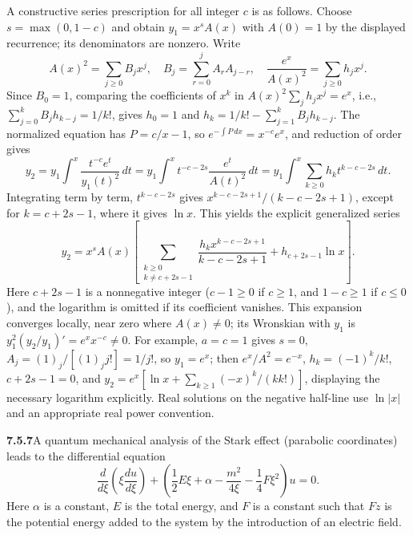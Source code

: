 \par{}
A constructive series prescription for all integer $c$ is as follows. Choose
$s=\max(0,1-c)$ and obtain $y_1=x^sA(x)$ with $A(0)=1$ by the displayed
recurrence; its denominators are nonzero. Write
\[
A(x)^2=\sum_{j\ge0}B_jx^j,\quad B_j=\sum_{r=0}^jA_rA_{j-r},
\quad \frac{e^x}{A(x)^2}=\sum_{j\ge0}h_jx^j.
\]
Since $B_0=1$, comparing the coefficients of $x^k$ in
$A(x)^2\sum_jh_jx^j=e^x$, i.e., $\sum_{j=0}^kB_jh_{k-j}=1/k!$, gives
$h_0=1$ and $h_k=1/k!-\sum_{j=1}^k B_jh_{k-j}$.
The normalized equation has $P=c/x-1$, so $e^{-\int P\,dx}=x^{-c}e^x$,
and reduction of order gives
\[
y_2=y_1\int^x\frac{t^{-c}e^t}{y_1(t)^2}\,dt
=y_1\int^x t^{-c-2s}\frac{e^t}{A(t)^2}\,dt
=y_1\int^x\sum_{k\ge0}h_kt^{k-c-2s}\,dt.
\]
Integrating term by term, $t^{k-c-2s}$ gives
$x^{k-c-2s+1}/(k-c-2s+1)$, except for $k=c+2s-1$, where it gives
$\ln x$. This yields the explicit generalized series
\[
y_2=x^sA(x)\left[
\sum_{\substack{k\ge0\\k\ne c+2s-1}}
 \frac{h_kx^{k-c-2s+1}}{k-c-2s+1}
+h_{c+2s-1}\ln x\right].
\]
Here $c+2s-1$ is a nonnegative integer ($c-1\ge0$ if $c\ge1$, and
$1-c\ge1$ if $c\le0$), and the logarithm is omitted
if its coefficient vanishes. This expansion converges locally, near zero
where $A(x)\ne0$; its Wronskian with $y_1$ is
$y_1^2(y_2/y_1)'=e^xx^{-c}\ne0$.
For example, $a=c=1$ gives $s=0$, $A_j=(1)_j/[(1)_jj!]=1/j!$, so
$y_1=e^x$; then $e^x/A^2=e^{-x}$, $h_k=(-1)^k/k!$, $c+2s-1=0$, and
$y_2=e^x[\ln x+\sum_{k\ge1}(-x)^k/(k k!)]$, displaying the necessary
logarithm explicitly. Real solutions on the negative half-line use
$\ln|x|$ and an appropriate real power convention.

\par\bigskip
\noindent\textbf{7.5.7}\quad A quantum mechanical analysis of the Stark effect
(parabolic coordinates) leads to the differential equation
\[
\frac{d}{d\xi}\left(\xi\frac{du}{d\xi}\right)
+\left(\frac{1}{2}E\xi+\alpha-\frac{m^{2}}{4\xi}-\frac{1}{4}F\xi^{2}\right)u=0.
\]
Here $\alpha$ is a constant, $E$ is the total energy, and $F$ is a constant
such that $Fz$ is the potential energy added to the system by the introduction
of an electric field.

